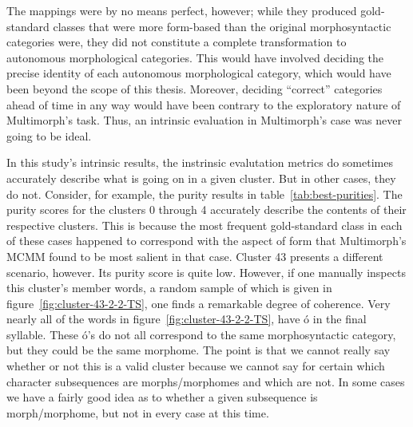 The mappings were by no means perfect, however; while they produced gold-standard classes that were more
form-based than the original morphosyntactic categories were, they did not constitute a complete transformation
to autonomous morphological categories. This would have involved deciding the precise identity of each autonomous 
morphological category, which would have been beyond the scope of this thesis. Moreover, deciding ``correct'' 
categories ahead of time in any way would have been contrary to the exploratory nature of Multimorph's task. 
Thus, an intrinsic evaluation in Multimorph's case was never going to be ideal.

In this study's intrinsic results, the instrinsic evalutation metrics do sometimes accurately describe what is going on in a given cluster. But in other cases, they do not. Consider, for example, the purity results in table~\ref{tab:best-purities}. The purity scores for the clusters 0 through 4 accurately describe the contents of their respective clusters. This is because the most frequent gold-standard class in each of these cases happened to correspond with the aspect of form that Multimorph's MCMM found to be most salient in that case.
Cluster 43 presents a different scenario, however. Its purity score is quite low. However, if one manually inspects this cluster's member words, a random sample of which is given in figure~\ref{fig:cluster-43-2-2-TS}, one finds a remarkable degree of coherence. Very nearly all of the words in 
figure~\ref{fig:cluster-43-2-2-TS}, have \textsf{\'{o}} in the final syllable. These \textsf{\'{o}}'s do not all correspond to the same morphosyntactic category, but they could be the same morphome. The point is that we cannot really say whether or not this is a valid cluster because we cannot say for certain which character subsequences are morphs/morphomes and which are not. In some cases we have a fairly good idea as to whether a given subsequence is morph/morphome, but not in every case at this time.

